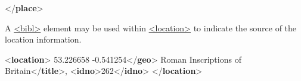 \begin{shaded}
\hspace*{1em}\hspace*{1em}\hspace*{1em}\mbox{}\newline 
\hspace*{1em}\hspace*{1em}\mbox{}\newline 
\hspace*{1em}\mbox{}\newline 
{}\mbox{}\newline 
{</\textbf{place}>}\end{shaded}\egroup\par \par
A \hyperref[TEI.bibl]{<bibl>} element may be used within \hyperref[TEI.location]{<location>} to indicate the source of the location information.\par\bgroup{}\exampleFont \begin{shaded}\noindent\mbox{}{<\textbf{location}>}\mbox{}\newline 
{}53.226658 -0.541254{</\textbf{geo}>}\mbox{}\newline 
{}\mbox{}\newline 
\hspace*{1em}Roman Inscriptions of Britain{</\textbf{title}>}, {<\textbf{idno}>}262{</\textbf{idno}>}\mbox{}\newline 
{}\mbox{}\newline 
{</\textbf{location}>}\end{shaded}\egroup\par 
